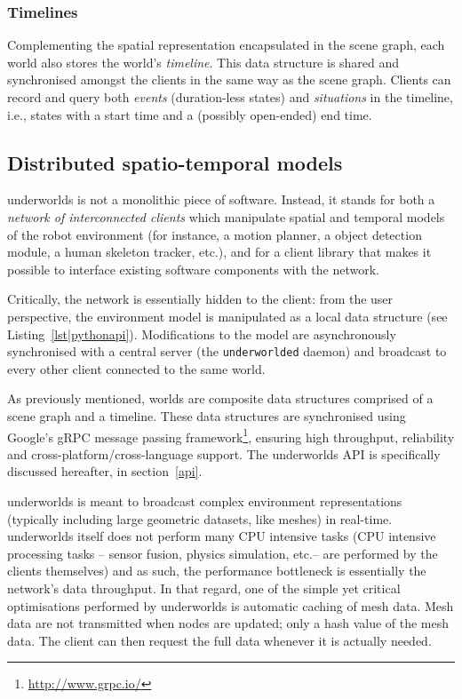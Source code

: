 \documentclass[letterpaper, 10pt, conference]{ieeeconf}
\newcommand{\ie}{i.e.,\xspace}
\newcommand{\etc}{etc.\xspace}
\newcommand{\uwds}{{\sc underworlds}\xspace}
\begin{document}
\subsubsection{Timelines}

Complementing the spatial representation encapsulated in the scene graph, each
world also stores the world's \emph{timeline}. This data structure is shared and
synchronised amongst the clients in the same way as the scene graph.  Clients
can record and query both \emph{events} (duration-less states) and \emph{situations} in
the timeline, \ie states with a start time and a (possibly open-ended) end time.


\subsection{Distributed spatio-temporal models}
\label{arch}

\uwds is not a monolithic piece of software. Instead, it stands for both a
\emph{network of interconnected clients} which manipulate spatial and temporal
models of the robot environment (for instance, a motion planner, a object
detection module, a human skeleton tracker, etc.), and for a {client library}
that makes it possible to interface existing software components with the network.

Critically, the network is essentially hidden to the client: from the user
perspective, the environment model is manipulated as a local data structure (see
Listing~\ref{lst|pythonapi}). Modifications to the model are asynchronously synchronised with
a central server (the {\tt underworlded} daemon) and broadcast to every other
client connected to the same world.

As previously mentioned, worlds are composite data structures comprised of a
scene graph and a timeline. These data structures are synchronised using
Google's gRPC message passing framework\footnote{\url{http://www.grpc.io/}}, ensuring
high throughput, reliability and cross-platform/cross-language support. The \uwds
API is specifically discussed hereafter, in section~\ref{api}.


\uwds is meant to broadcast complex environment representations (typically
including large geometric datasets, like meshes) in real-time. \uwds itself does
not perform many CPU intensive tasks (CPU intensive processing tasks -- sensor
fusion, physics simulation, \etc -- are performed by the clients themselves) and
as such, the performance bottleneck is essentially the network's data
throughput.  In that regard, one of the simple yet critical optimisations
performed by \uwds is automatic caching of mesh data. Mesh data are not
transmitted when nodes are updated; only a hash value of the mesh data. The
client can then request the full data whenever it is actually needed.
\end{document}
